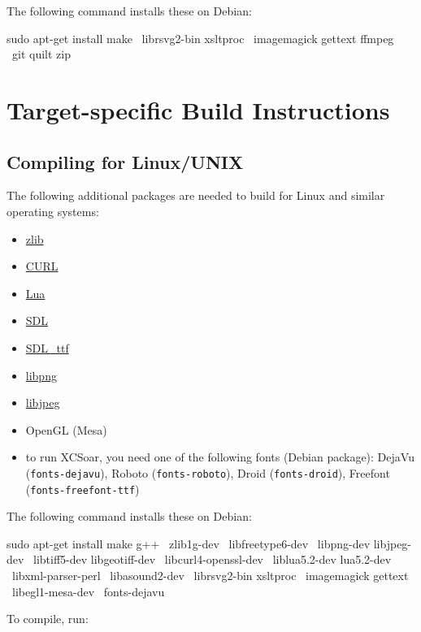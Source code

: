 The following command installs these on Debian:

\begin{verbatim*}
sudo apt-get install make \
  librsvg2-bin xsltproc \
  imagemagick gettext ffmpeg \
  git quilt zip
\end{verbatim*}

\section{Target-specific Build Instructions}

\subsection{Compiling for Linux/UNIX}

The following additional packages are needed to build for Linux and
similar operating systems:

\begin{itemize}
\item \href{http://www.zlib.net/}{zlib}
\item \href{http://curl.haxx.se/}{CURL}
\item \href{http://www.lua.org/}{Lua}
\item \href{http://www.libsdl.org/}{SDL}
\item \href{http://www.libsdl.org/projects/SDL\_ttf/}{SDL\_ttf}
\item \href{http://www.libpng.org/}{libpng}
\item \href{http://libjpeg.sourceforge.net/}{libjpeg}
\item OpenGL (Mesa)
\item to run XCSoar, you need one of the following fonts (Debian
  package): DejaVu (\texttt{fonts-dejavu}),
  Roboto (\texttt{fonts-roboto}),
  Droid (\texttt{fonts-droid}),
  Freefont (\texttt{fonts-freefont-ttf})
\end{itemize}

The following command installs these on Debian:

\begin{verbatim*}
sudo apt-get install make g++ \
  zlib1g-dev \
  libfreetype6-dev \
  libpng-dev libjpeg-dev \
  libtiff5-dev libgeotiff-dev \
  libcurl4-openssl-dev \
  liblua5.2-dev lua5.2-dev \
  libxml-parser-perl \
  libasound2-dev \
  librsvg2-bin xsltproc \
  imagemagick gettext \
  libegl1-mesa-dev \
  fonts-dejavu
\end{verbatim*}

To compile, run:

